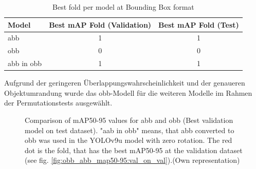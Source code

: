 \begin{table}[h]
\centering
\begin{tabular}{l c c}
\hline
\textbf{Model} & \textbf{Best mAP Fold (Validation)} & \textbf{Best mAP Fold (Test)} \\ 
\hline
abb &  1 & 1 \\
obb &  0 & 0 \\
abb in obb &  1 & 1 \\
\hline
\end{tabular}
\caption{Best fold per model at Bounding Box format}
\label{tab:best_folds_area}
\end{table}

Aufgrund der geringeren Überlappungswahrscheinlichkeit und der genaueren Objektumrandung wurde das \acrshort{obb}-Modell für die weiteren Modelle im Rahmen der Permutationstests ausgewählt.

\begin{figure}[htbp]
    \centering
    
    \caption[Comparison of \acrshort{mAP}50-95 values for \acrshort{abb} and \acrshort{obb} (Best validation model on test dataset)]{Comparison of \acrshort{mAP}50-95 values for \acrshort{abb} and \acrshort{obb} (Best validation model on test dataset). "aab in obb" means, that \acrlong{abb} converted to obb was used in the \acrshort{YOLO}v9u model with zero rotation. The red dot is the fold, that has the best \acrshort{mAP}50-95 at the validation dataset (see fig. \ref{fig:obb_abb_map50-95:val_on_val}).(Own representation)}
    \label{fig:obb_abb_map50-95:val_on_test}
\end{figure}



